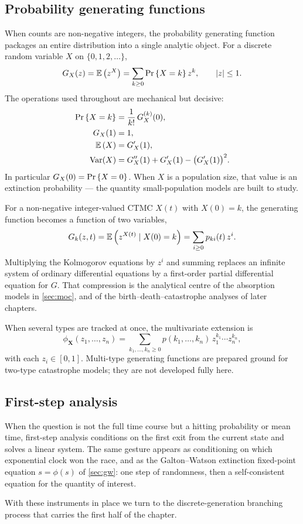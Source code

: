 \subsection{Probability generating functions}
\label{sec:pgf-prelim}

When counts are non-negative integers, the probability generating function packages an
entire distribution into a single analytic object. For a discrete random variable $X$
on $\{0,1,2,\ldots\}$,
\begin{equation}
\label{eq:pgf-def}
G_X(z)=\mathbb{E}\left(z^X\right)=\sum_{k\ge 0}{\text{Pr}\left\{X=k\right\}}\,z^k,\qquad |z|\le 1.
\end{equation}
The operations used throughout are mechanical but decisive:
\begin{align*}
{\text{Pr}\left\{X=k\right\}}&=\frac1{k!}\,G_X^{(k)}(0),\\
G_X(1)&=1,\\
\mathbb{E}\left(X\right)&=G_X'(1),\\
\mathrm{Var}(X)&=G_X''(1)+G_X'(1)-\bigl(G_X'(1)\bigr)^2.
\end{align*}
In particular $G_X(0)={\text{Pr}\left\{X=0\right\}}$. When $X$ is a population size, that value is an
extinction probability --- the quantity small-population models are built to study.

For a non-negative integer-valued CTMC $X(t)$ with $X(0)=k$, the generating function
becomes a function of two variables,
\begin{equation}
\label{eq:pgf-process}
G_k(z,t)=\mathbb{E}\left(z^{X(t)}\mid X(0)=k\right)=\sum_{i\ge 0}p_{ki}(t)\,z^i.
\end{equation}
Multiplying the Kolmogorov equations by $z^i$ and summing replaces an infinite system of
ordinary differential equations by a first-order partial differential equation for $G$.
That compression is the analytical centre of the absorption models in \cref{sec:moc}, and
of the birth--death--catastrophe analyses of later chapters.

When several types are tracked at once, the multivariate extension is
\begin{equation}
\label{eq:pgf-multi}
\phi_{\mathbf{X}}(z_1,\ldots,z_n)
=\sum_{k_1,\ldots,k_n\ge 0}
p(k_1,\ldots,k_n)\, z_1^{k_1}\cdots z_n^{k_n},
\end{equation}
with each $z_i\in[0,1]$. Multi-type generating functions are prepared ground for
two-type catastrophe models; they are not developed fully here.

\subsection{First-step analysis}
\label{sec:first-step}

When the question is not the full time course but a hitting probability or mean time,
first-step analysis conditions on the first exit from the current state and solves a
linear system. The same gesture appears as conditioning on which exponential clock won
the race, and as the Galton--Watson extinction fixed-point equation $s=\phi(s)$ of
\cref{sec:gw}: one step of randomness, then a self-consistent equation for the quantity
of interest.

With these instruments in place we turn to the discrete-generation branching process
that carries the first half of the chapter.
